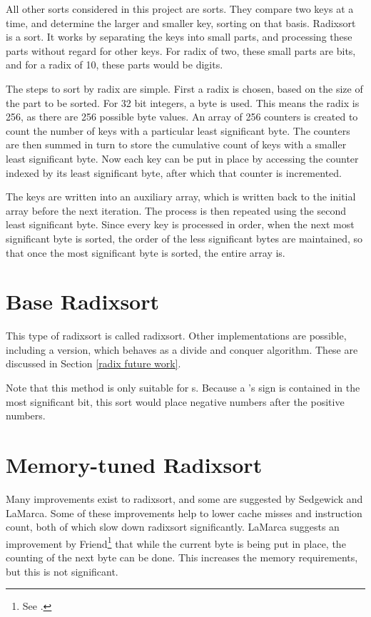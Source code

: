 \label{radix}

All other sorts considered in this project are  sorts.
They compare two keys at a time, and determine the larger and smaller key,
sorting on that basis. Radixsort is a  sort. It works by
separating the keys into small parts, and processing these parts without
regard for other keys. For radix of two, these small parts are bits, and for a
radix of 10, these parts would be digits. 

The steps to sort by radix are simple. First a radix is chosen, based on the
size of the part to be sorted. For 32 bit integers, a byte is used. This means
the radix is 256, as there are 256 possible byte values. An array of 256
counters is created to count the number of keys with a particular least
significant byte. The counters are then summed in turn to store the cumulative
count of keys with a smaller least significant byte. Now each key can be put in
place by accessing the counter indexed by its least significant byte, after
which that counter is incremented.

The keys are written into an auxiliary array, which is written back to the initial
array before the next iteration. The process is then repeated using the second
least significant byte.  Since every key is processed in order, when the next
most significant byte is sorted, the order of the less significant bytes are
maintained, so that once the most significant byte is sorted, the entire array
is.

\section{Base Radixsort}

This type of radixsort is called  radixsort.
Other implementations are possible, including a 
version, which behaves as a divide and conquer algorithm. These are discussed
in Section \ref{radix future work}.

Note that this method is only suitable for s. Because a
's sign is contained in the most significant bit, this sort would
place negative numbers after the positive numbers.

\section{Memory-tuned Radixsort}
Many improvements exist to radixsort, and some are suggested by Sedgewick and
LaMarca. Some of these improvements help to lower cache misses and instruction
count, both of which slow down radixsort significantly. LaMarca suggests an
improvement by Friend\footnote{See \cite{Friend56:152}.} that while the current
byte is being put in place, the counting of the next byte can be done. This
increases the memory requirements, but this is not significant.

